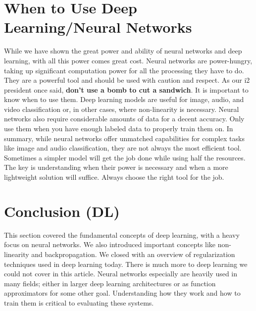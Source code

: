 \section{When to Use Deep Learning/Neural Networks}
    \large While we have shown the great power and ability of neural networks and deep learning, with all this power comes great cost. Neural networks are power-hungry, taking up significant computation power for all the processing they have to do. They are a powerful tool and should be used with caution and respect. As our i2 president once said, \textbf{don't use a bomb to cut a sandwich}. It is important to know when to use them. Deep learning models are useful for image, audio, and video classification or, in other cases, where non-linearity is necessary. Neural networks also require considerable amounts of data for a decent accuracy. Only use them when you have enough labeled data to properly train them on. In summary, while neural networks offer unmatched capabilities for complex tasks like image and audio classification, they are not always the most efficient tool. Sometimes a simpler model will get the job done while using half the resources. The key is understanding when their power is necessary and when a more lightweight solution will suffice. Always choose the right tool for the job.

\section{Conclusion (DL)}
    \large This section covered the fundamental concepts of deep learning, with a heavy focus on neural networks. We also introduced important concepts like non-linearity and backpropagation. We closed with an overview of regularization techniques used in deep learning today. There is much more to deep learning we could not cover in this article. Neural networks especially are heavily used in many fields; either in larger deep learning architectures or as function approximators for some other goal. Understanding how they work and how to train them is critical to evaluating these systems. 
